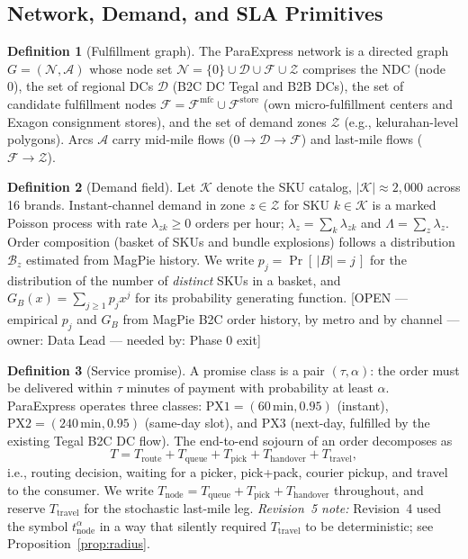 \documentclass[10pt,twocolumn,letterpaper]{article}
\theoremstyle{definition}
\newtheorem{definition}{Definition}
\newcommand{\OPEN}[3]{{\color{openred}\footnotesize\textsf{[OPEN --- #1 --- owner: #2 --- needed by: #3]}}}
\begin{document}
\subsection{Network, Demand, and SLA Primitives}

\begin{definition}[Fulfillment graph]
The ParaExpress network is a directed graph $G=(\mathcal{N},\mathcal{A})$ whose node set $\mathcal{N}=\{0\}\cup\mathcal{D}\cup\mathcal{F}\cup\mathcal{Z}$ comprises the NDC (node 0), the set of regional DCs $\mathcal{D}$ (B2C DC Tegal and B2B DCs), the set of candidate fulfillment nodes $\mathcal{F}=\mathcal{F}^{\mathrm{mfc}}\cup\mathcal{F}^{\mathrm{store}}$ (own micro-fulfillment centers and Exagon consignment stores), and the set of demand zones $\mathcal{Z}$ (e.g., kelurahan-level polygons). Arcs $\mathcal{A}$ carry mid-mile flows ($0\to\mathcal{D}\to\mathcal{F}$) and last-mile flows ($\mathcal{F}\to\mathcal{Z}$).
\end{definition}

\begin{definition}[Demand field]
Let $\mathcal{K}$ denote the SKU catalog, $|\mathcal{K}|\approx 2{,}000$ across 16 brands. Instant-channel demand in zone $z\in\mathcal{Z}$ for SKU $k\in\mathcal{K}$ is a marked Poisson process with rate $\lambda_{zk}\ge 0$ orders per hour; $\lambda_z=\sum_k\lambda_{zk}$ and $\Lambda=\sum_z\lambda_z$. Order composition (basket of SKUs and bundle explosions) follows a distribution $\mathcal{B}_z$ estimated from MagPie history. We write $p_j=\Pr[\,|B|=j\,]$ for the distribution of the number of \emph{distinct} SKUs in a basket, and $G_B(x)=\sum_{j\ge 1}p_jx^{j}$ for its probability generating function. \OPEN{empirical $p_j$ and $G_B$ from MagPie B2C order history, by metro and by channel}{Data Lead}{Phase 0 exit}
\end{definition}

\begin{definition}[Service promise]
A promise class is a pair $(\tau,\alpha)$: the order must be delivered within $\tau$ minutes of payment with probability at least $\alpha$. ParaExpress operates three classes: $\mathrm{PX1}=(60\,\mathrm{min},0.95)$ (instant), $\mathrm{PX2}=(240\,\mathrm{min},0.95)$ (same-day slot), and $\mathrm{PX3}$ (next-day, fulfilled by the existing Tegal B2C DC flow). The end-to-end sojourn of an order decomposes as
\begin{equation}\label{eq:sojourn}
T=T_{\mathrm{route}}+T_{\mathrm{queue}}+T_{\mathrm{pick}}+T_{\mathrm{handover}}+T_{\mathrm{travel}},
\end{equation}
i.e., routing decision, waiting for a picker, pick+pack, courier pickup, and travel to the consumer. We write $T_{\mathrm{node}}=T_{\mathrm{queue}}+T_{\mathrm{pick}}+T_{\mathrm{handover}}$ throughout, and reserve $T_{\mathrm{travel}}$ for the stochastic last-mile leg. \emph{Revision~5 note:} Revision~4 used the symbol $t^{\alpha}_{\mathrm{node}}$ in a way that silently required $T_{\mathrm{travel}}$ to be deterministic; see Proposition~\ref{prop:radius}.
\end{definition}
\end{document}
